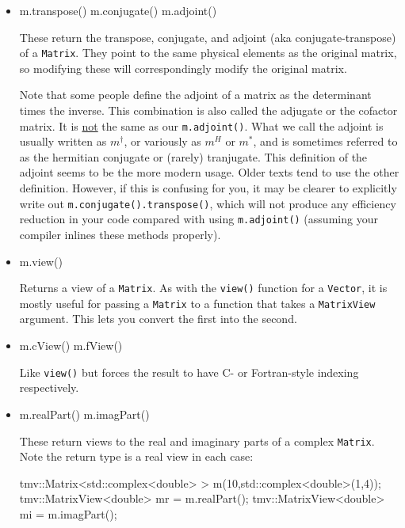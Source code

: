 \documentclass[twoside,letterpaper,11pt]{article}
\renewcommand{\tt}[1]{{\lstinline {#1}}}
\begin{document}
\begin{itemize}
\item
\begin{tmvcode}
m.transpose()
m.conjugate()
m.adjoint()
\end{tmvcode}
These return the transpose, conjugate, and adjoint (aka conjugate-transpose) 
of a \tt{Matrix}.  They point to the 
same physical elements as the original matrix, so modifying these will
correspondingly modify the original matrix.

Note that some people define the adjoint of a matrix as the determinant times
the inverse.  This combination is also called the adjugate or the cofactor matrix.
It is \underline{not} the same as our \tt{m.adjoint()}.  What we call the adjoint 
is usually written as $m^\dagger$, or variously as $m^H$ or $m^*$, 
and is sometimes referred to as the hermitian conjugate
or (rarely) tranjugate.  This definition of the adjoint seems to be the more modern
usage.  Older texts tend to use the other definition.  However, if this is confusing
for you, it may be clearer to explicitly write out \tt{m.conjugate().transpose()},
which will not produce any efficiency reduction in your code compared with using
\tt{m.adjoint()} (assuming your compiler inlines these methods properly).

\item
\begin{tmvcode}
m.view()
\end{tmvcode}
Returns a view of a \tt{Matrix}.  As with the \tt{view()} function for a \tt{Vector}, it is mostly
useful for passing a \tt{Matrix} to a function that takes a \tt{MatrixView} argument.  
This lets you convert the first into the second.

\item
\begin{tmvcode}
m.cView()
m.fView()
\end{tmvcode}
Like \tt{view()} but forces the result to have C- or Fortran-style indexing respectively.

\item
\begin{tmvcode}
m.realPart()
m.imagPart()
\end{tmvcode}
These return views to the real and imaginary parts of a complex \tt{Matrix}.
Note the return type is a real view in each case:
\begin{tmvcode}
tmv::Matrix<std::complex<double> > m(10,std::complex<double>(1,4));
tmv::MatrixView<double> mr = m.realPart();
tmv::MatrixView<double> mi = m.imagPart();
\end{tmvcode}


\end{itemize}
\end{document}
